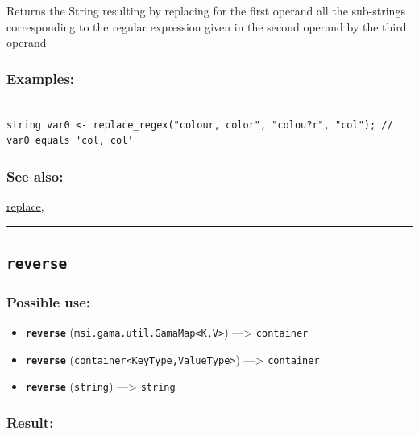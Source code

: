\documentclass[]{book}
\providecommand{\tightlist}{%
  \setlength{\itemsep}{0pt}\setlength{\parskip}{0pt}}
\theoremstyle{definition}
\theoremstyle{definition}
\theoremstyle{definition}
\theoremstyle{remark}
\begin{document}
Returns the String resulting by replacing for the first operand all the
sub-strings corresponding to the regular expression given in the second
operand by the third operand

\subsubsection{Examples:}\label{examples-298}

\begin{verbatim}
 
string var0 <- replace_regex("colour, color", "colou?r", "col"); // var0 equals 'col, col'
\end{verbatim}

\subsubsection{See also:}\label{see-also-174}

\href{operators-n-to-r.html\#replace}{replace},

\begin{center}\rule{0.5\linewidth}{\linethickness}\end{center}

\subsection{\texorpdfstring{\texttt{reverse}}{reverse}}\label{reverse}

\subsubsection{Possible use:}\label{possible-use-435}

\begin{itemize}
\tightlist
\item
  \textbf{\texttt{reverse}}
  (\texttt{msi.gama.util.GamaMap\textless{}K,V\textgreater{}})
  ---\textgreater{} \texttt{container}
\item
  \textbf{\texttt{reverse}}
  (\texttt{container\textless{}KeyType,ValueType\textgreater{}})
  ---\textgreater{} \texttt{container}
\item
  \textbf{\texttt{reverse}} (\texttt{string}) ---\textgreater{}
  \texttt{string}
\end{itemize}

\subsubsection{Result:}\label{result-421}
\end{document}
